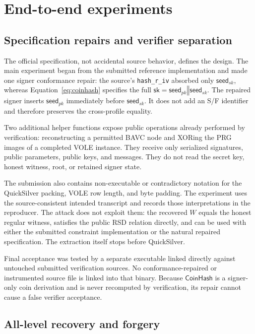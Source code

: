 \documentclass[11pt,a4paper]{article}
\newcommand{\concat}{\mathbin\Vert}
\newcommand{\sk}{\ensuremath{\mathsf{sk}}}
\newcommand{\CoinHash}{\ensuremath{\mathsf{CoinHash}}}
\begin{document}
\section{End-to-end experiments}

\subsection{Specification repairs and verifier separation}

The official specification, not accidental source behavior, defines the design.
The main experiment began from the submitted reference implementation and made
one signer conformance repair: the source's \texttt{hash\_r\_iv} absorbed only
$\mathsf{seed}_{sk}$, whereas Equation~\eqref{eq:coinhash} specifies the full
$\sk=\mathsf{seed}_{pk}\concat\mathsf{seed}_{sk}$.  The repaired signer inserts
$\mathsf{seed}_{pk}$ immediately before $\mathsf{seed}_{sk}$.  It does not add
an S/F identifier and therefore preserves the cross-profile equality.

Two additional helper functions expose public operations already performed by
verification: reconstructing a permitted BAVC node and XORing the PRG images of
a completed VOLE instance.  They receive only serialized signatures, public
parameters, public keys, and messages.  They do not read the secret key, honest
witness, root, or retained signer state.

The submission also contains non-executable or contradictory notation for the
QuickSilver packing, VOLE row length, and byte padding.  The experiment uses the
source-consistent intended transcript and records those interpretations in the
reproducer.  The attack does not exploit them: the recovered $W$ equals the
honest regular witness, satisfies the public RSD relation directly, and can be
used with either the submitted constraint implementation or the natural repaired
specification.  The extraction itself stops before QuickSilver.

Final acceptance was tested by a separate executable linked directly against
untouched submitted verification sources.  No conformance-repaired or
instrumented source file is linked into that binary.  Because \CoinHash{} is a
signer-only coin derivation and is never recomputed by verification, its repair
cannot cause a false verifier acceptance.

\subsection{All-level recovery and forgery}
\end{document}
